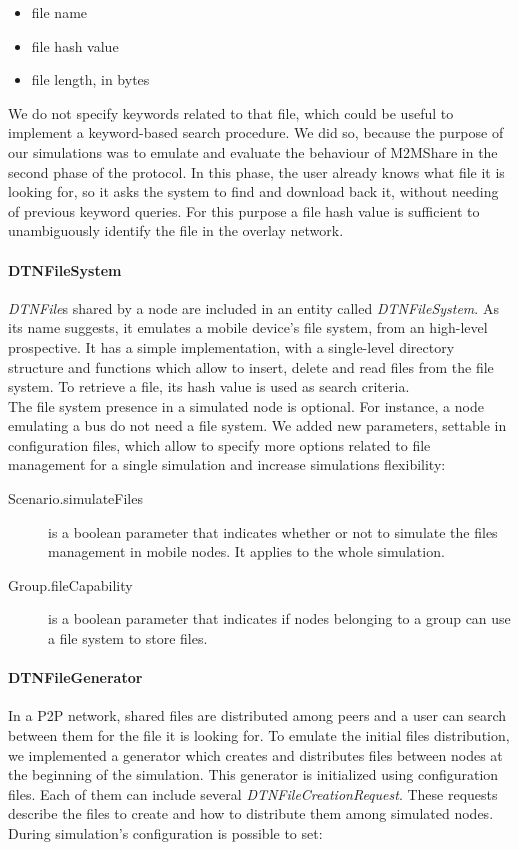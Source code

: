 \begin{itemize}
\item file name
\item file hash value
\item file length, in bytes
\end{itemize}

We do not specify keywords related to that file, which could be useful to implement a keyword-based search procedure. We did so, because the purpose of our simulations was to emulate and evaluate the behaviour of M2MShare in the second phase of the protocol. In this phase, the user already knows what file it is looking for, so it asks the system to find and download back it, without needing of previous keyword queries. For this purpose a file hash value is sufficient to unambiguously identify the file in the overlay network.


\paragraph{DTNFileSystem}
\textit{DTNFile}s shared by a node are included in an entity called \textit{DTNFileSystem}. As its name suggests, it emulates a mobile device's file system, from an high-level prospective. It has a simple implementation, with a single-level directory structure and functions which allow to insert, delete and read files from the file system. To retrieve a file, its hash value is used as search criteria.
\\

The file system presence in a simulated node is optional. For instance, a node emulating a bus do not need a file system. We added new parameters, settable in configuration files, which allow to specify more options related to file management for a single simulation and increase simulations flexibility: 

\begin{description}
\item[Scenario.simulateFiles] is a boolean parameter that indicates whether or not to simulate the files management in mobile nodes. It applies to the whole simulation.
\item[Group.fileCapability] is a boolean parameter that indicates if nodes belonging to a group can use a file system to store files.
\end{description}

\paragraph{DTNFileGenerator}
\label{fileGeneratorImplementazione}
In a P2P network, shared files are distributed among peers and a user can search between them for the file it is looking for. To emulate the initial files distribution, we implemented a generator which creates and distributes files between nodes at the beginning of the simulation. This generator is initialized using configuration files. Each of them can include several \textit{DTNFileCreationRequest}. These requests describe the files to create and how to distribute them among simulated nodes. During simulation's configuration is possible to set:

